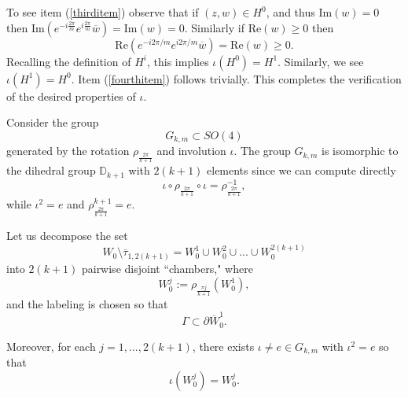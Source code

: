 \documentclass[11pt, reqno]{amsart}
\numberwithin{equation}{section}
\begin{document}
To see item (\ref{thirditem}) observe that if $(z,w)\in H^0$, and thus $\mbox{Im}(w)=0$ then $\mbox{Im}(e^{-i\frac{2\pi}{m}}e^{i\frac{2\pi}{m}}\overline{w})=\mbox{Im}(w)=0$.  Similarly if $\mbox{Re}(w)\geq 0$ then \begin{equation}\mbox{Re}(e^{-i2\pi/m}e^{i2\pi/m}\overline{w})=\mbox{Re}(w)\geq 0.\end{equation}  Recalling the definition of $H^i$, this implies $\iota(H^0)=H^1$.  Similarly, we see $\iota(H^1)=H^0$. Item (\ref{fourthitem}) follows trivially.  This completes the verification of the desired properties of $\iota$.

Consider the group 
\begin{equation}\label{GkmGrp}
    G_{k,m}\subset SO(4)
\end{equation} generated by the rotation $\rho_{\frac{2\pi}{k+1}}$ and involution $\iota$.  The group $G_{k,m}$ is isomorphic to the dihedral group $\mathbb{D}_{k+1}$ with $2(k+1)$ elements since we can compute directly 
\begin{equation}\label{relation}
\iota\circ \rho_{\frac{2\pi}{k+1}}\circ\iota =\rho^{-1}_{\frac{2\pi}{k+1}},
\end{equation}
while $\iota^2=e$ and $\rho^{k+1}_{\frac{2\pi}{k+1}}=e$.

Let us decompose the set
\begin{equation}
W_0\setminus \overline{\tau}_{1,2(k+1)}=W_0^1\cup W_0^2\cup...\cup W_0^{2(k+1)}
\end{equation}
into $2(k+1)$ pairwise disjoint ``chambers," where
\begin{equation}
W_0^j:=\rho_{\frac{\pi j}{k+1}}(W_0^1), 
\end{equation}
and the labeling is chosen so that
\begin{equation}\label{whereisgamma}
\Gamma\subset \partial \overline{W}_0^1.
\end{equation}

Moreover, for each $j=1,...,2(k+1)$, there exists $\iota\neq e\in G_{k,m}$ with $\iota^2=e$ so that 
\begin{equation}
\iota(W_0^j)=W^j_0.
\end{equation}
\end{document}
